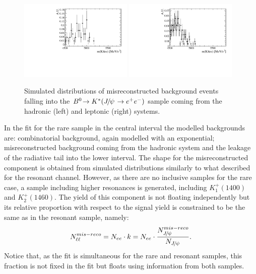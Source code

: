 \begin{figure}[h!]
\centering
\includegraphics[width=0.48\textwidth]{RKst/figs/misreco/part_had_jpsi.pdf}
\includegraphics[width=0.48\textwidth]{RKst/figs/misreco/part_lpt_jpsi.pdf}
\caption{Simulated distributions of misreconstructed background events falling into
the $\decay{\Bz}{\Kstar(\jpsi\to\ee)}$ sample coming from the
hadronic (left) and leptonic (right) systems.}
\label{fig:RKst_misreco_distrib}
\end{figure}

In the fit for the rare sample in the central \qsq interval the modelled
backgrounds are: combinatorial background, again modelled with an exponential; misreconstructed background
coming from the hadronic system and the leakage of the \jpsi radiative tail into the lower \qsq interval.
The shape for the misreconstructed component is obtained from simulated distributions similarly to what described
for the resonant channel. However, as there are no inclusive samples for the rare case,
a sample including higher \Kstar resonances is generated, including $K_1^+(1400)$ and $K_2^+(1460)$.
The yield of this component is not floating independently but its relative proportion
with respect to the signal yield is constrained to be the same as in the resonant sample, namely:
\begin{equation}
N_{\ell\ell}^{mis-reco} = N_{ee} \cdot k = N_{ee} \cdot \frac{N_{\jpsi}^{mis-reco}}{N_{\jpsi}}.
\end{equation}
Notice that, as the fit is simultaneous for the rare and resonant samples, this fraction
is not fixed in the fit but floats using information from both samples.


